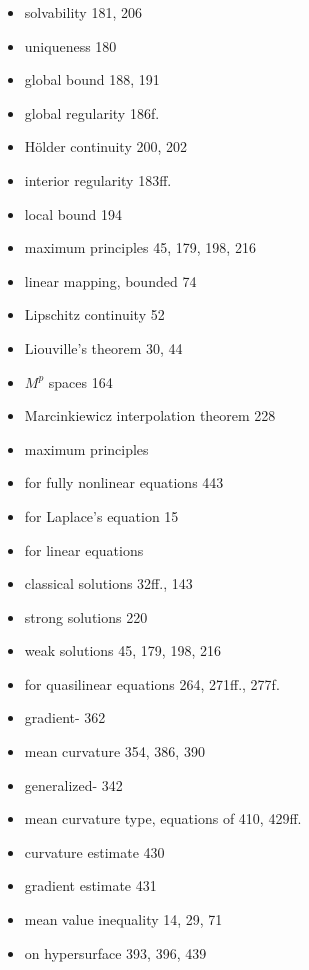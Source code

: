 \begin{itemize}
\item[] \qquad \quad solvability \hfill 181, 206
\item[] \qquad \quad uniqueness \hfill 180
\item[] \qquad global bound \hfill 188, 191
\item[] \qquad global regularity \hfill 186f.
\item[] \qquad Hölder continuity \hfill 200, 202
\item[] \qquad interior regularity \hfill 183ff.
\item[] \qquad local bound \hfill 194
\item[] \qquad maximum principles \hfill 45, 179, 198, 216
\item[] linear mapping, bounded \hfill 74
\item[] Lipschitz continuity \hfill 52
\item[] Liouville's theorem \hfill 30, 44

\item[] $M^p$ spaces \hfill 164
\item[] Marcinkiewicz interpolation theorem \hfill 228
\item[] maximum principles
\item[] \quad for fully nonlinear equations \hfill 443
\item[] \quad for Laplace's equation \hfill 15
\item[] \quad for linear equations
\item[] \qquad classical solutions \hfill 32ff., 143
\item[] \qquad strong solutions \hfill 220
\item[] \qquad weak solutions \hfill 45, 179, 198, 216
\item[] \quad for quasilinear equations \hfill 264, 271ff., 277f.
\item[] \qquad gradient- \hfill 362
\item[] mean curvature \hfill 354, 386, 390
\item[] \qquad generalized- \hfill 342
\item[] mean curvature type, equations of \hfill 410, 429ff.
\item[] \qquad curvature estimate \hfill 430
\item[] \qquad gradient estimate \hfill 431
\item[] mean value inequality \hfill 14, 29, 71
\item[] \quad on hypersurface \hfill 393, 396, 439


\end{itemize}
